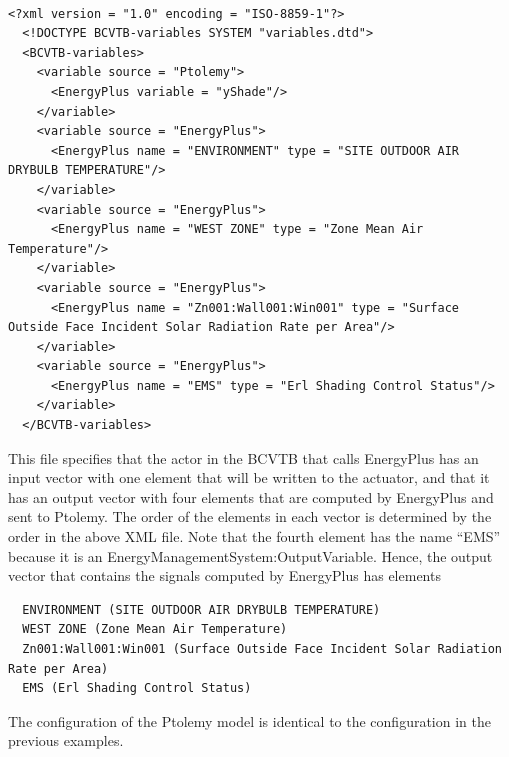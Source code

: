 \begin{lstlisting}

<?xml version = "1.0" encoding = "ISO-8859-1"?>
  <!DOCTYPE BCVTB-variables SYSTEM "variables.dtd">
  <BCVTB-variables>
    <variable source = "Ptolemy">
      <EnergyPlus variable = "yShade"/>
    </variable>
    <variable source = "EnergyPlus">
      <EnergyPlus name = "ENVIRONMENT" type = "SITE OUTDOOR AIR DRYBULB TEMPERATURE"/>
    </variable>
    <variable source = "EnergyPlus">
      <EnergyPlus name = "WEST ZONE" type = "Zone Mean Air Temperature"/>
    </variable>
    <variable source = "EnergyPlus">
      <EnergyPlus name = "Zn001:Wall001:Win001" type = "Surface Outside Face Incident Solar Radiation Rate per Area"/>
    </variable>
    <variable source = "EnergyPlus">
      <EnergyPlus name = "EMS" type = "Erl Shading Control Status"/>
    </variable>
  </BCVTB-variables>
\end{lstlisting}

This file specifies that the actor in the BCVTB that calls EnergyPlus has an input vector with one element that will be written to the actuator, and that it has an output vector with four elements that are computed by EnergyPlus and sent to Ptolemy. The order of the elements in each vector is determined by the order in the above XML file. Note that the fourth element has the name ``EMS'' because it is an EnergyManagementSystem:OutputVariable. Hence, the output vector that contains the signals computed by EnergyPlus has elements

\begin{lstlisting}
  ENVIRONMENT (SITE OUTDOOR AIR DRYBULB TEMPERATURE)
  WEST ZONE (Zone Mean Air Temperature)
  Zn001:Wall001:Win001 (Surface Outside Face Incident Solar Radiation Rate per Area)
  EMS (Erl Shading Control Status)
\end{lstlisting}

The configuration of the Ptolemy model is identical to the configuration in the previous examples.
